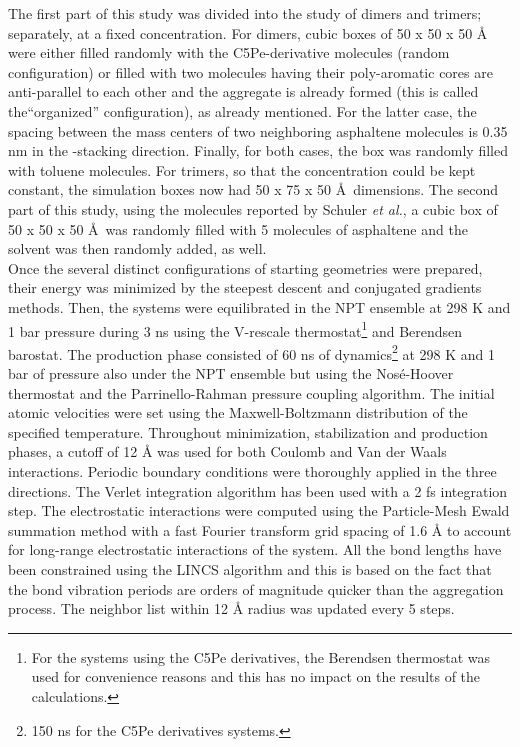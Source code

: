 The first part of this study was divided into the study of dimers and trimers; separately, at a fixed concentration. For dimers, cubic boxes of 50 x  50 x 50 \AA~ were either filled randomly with the C5Pe-derivative molecules (random configuration) or filled with two molecules having their poly-aromatic cores are anti-parallel to each other and the aggregate is already formed (this is called the``organized'' configuration), as already mentioned. For the latter case, the spacing between the mass centers of two neighboring asphaltene molecules is 0.35 nm in the -stacking direction. Finally, for both cases, the box was randomly filled with toluene molecules. For trimers, so that the concentration could be kept constant, the simulation boxes now had 50 x  75 x 50 \AA~dimensions. The second part of this study, using the molecules reported by Schuler \textit{et al.}, a cubic box of 50 x  50 x 50 \AA~was randomly filled with 5 molecules of asphaltene and the solvent was then randomly added, as well.\\

Once the several distinct configurations of starting geometries were prepared, their energy was minimized by the steepest descent and conjugated gradients methods. Then, the systems were equilibrated in the NPT ensemble at 298 K and 1 bar pressure during 3 ns using the V-rescale thermostat\cite{bussi2007canonical}\footnote{For the systems using the C5Pe derivatives, the Berendsen thermostat was used for convenience reasons and this has no impact on the results of the calculations.} and Berendsen barostat.\cite{berendsen1984molecular} The production phase consisted of 60 ns of dynamics\footnote{150 ns for the C5Pe derivatives systems.} at 298 K  and 1 bar of pressure also under the NPT ensemble but using the Nosé-Hoover thermostat\cite{hoover1985canonical,nose1984molecular} and the Parrinello-Rahman\cite{parrinello1981polymorphic} pressure coupling algorithm. The initial atomic velocities were set using the Maxwell-Boltzmann distribution of the specified temperature. Throughout minimization, stabilization and production phases, a cutoff of 12 \textup{\AA} was used for both Coulomb and Van der Waals interactions. Periodic boundary conditions were thoroughly applied in the three directions. The Verlet integration algorithm\cite{verlet1967computer} has been used with a 2 fs integration step. The electrostatic interactions were computed using the Particle-Mesh Ewald\cite{essmann1995smooth} summation method with a fast Fourier transform grid spacing of 1.6 \textup{\AA}  to account for long-range electrostatic interactions of the system.  All the bond lengths have been constrained using the LINCS algorithm\cite{hess1997lincs} and this is based on the fact that the bond vibration periods are orders of magnitude quicker than the aggregation process. The neighbor list within 12 \textup{\AA} radius was updated every 5 steps.\\

